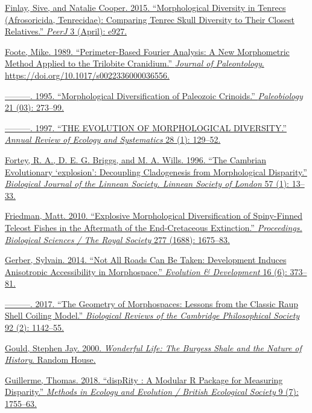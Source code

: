 \href{http://paperpile.com/b/sTGYvp/yyNa}{Finlay, Sive, and Natalie
Cooper. 2015. ``Morphological Diversity in Tenrecs (Afrosoricida,
Tenrecidae): Comparing Tenrec Skull Diversity to Their Closest
Relatives.'' \emph{PeerJ} 3 (April): e927.}

\href{http://paperpile.com/b/sTGYvp/2Neu}{Foote, Mike. 1989.
``Perimeter-Based Fourier Analysis: A New Morphometric Method Applied to
the Trilobite Cranidium.'' \emph{Journal of Paleontology}.
https://doi.org/}\href{http://dx.doi.org/10.1017/s0022336000036556}{10.1017/s0022336000036556}\href{http://paperpile.com/b/sTGYvp/2Neu}{.}

\href{http://paperpile.com/b/sTGYvp/fTJ3}{---------. 1995.
``Morphological Diversification of Paleozoic Crinoids.''
\emph{Paleobiology} 21 (03): 273--99.}

\href{http://paperpile.com/b/sTGYvp/yqPw}{---------. 1997. ``THE
EVOLUTION OF MORPHOLOGICAL DIVERSITY.'' \emph{Annual Review of Ecology
and Systematics} 28 (1): 129--52.}

\href{http://paperpile.com/b/sTGYvp/2tbJ}{Fortey, R. A., D. E. G.
Briggs, and M. A. Wills. 1996. ``The Cambrian Evolutionary `explosion':
Decoupling Cladogenesis from Morphological Disparity.'' \emph{Biological
Journal of the Linnean Society. Linnean Society of London} 57 (1):
13--33.}

\href{http://paperpile.com/b/sTGYvp/EETc}{Friedman, Matt. 2010.
``Explosive Morphological Diversification of Spiny-Finned Teleost Fishes
in the Aftermath of the End-Cretaceous Extinction.'' \emph{Proceedings.
Biological Sciences / The Royal Society} 277 (1688): 1675--83.}

\href{http://paperpile.com/b/sTGYvp/SJbC}{Gerber, Sylvain. 2014. ``Not
All Roads Can Be Taken: Development Induces Anisotropic Accessibility in
Morphospace.'' \emph{Evolution \& Development} 16 (6): 373--81.}

\href{http://paperpile.com/b/sTGYvp/QVvv}{---------. 2017. ``The
Geometry of Morphospaces: Lessons from the Classic Raup Shell Coiling
Model.'' \emph{Biological Reviews of the Cambridge Philosophical
Society} 92 (2): 1142--55.}

\href{http://paperpile.com/b/sTGYvp/Uns3}{Gould, Stephen Jay. 2000.
\emph{Wonderful Life: The Burgess Shale and the Nature of History}.
Random House.}

\href{http://paperpile.com/b/sTGYvp/xDqf}{Guillerme, Thomas. 2018.
``dispRity : A Modular R Package for Measuring Disparity.''
\emph{Methods in Ecology and Evolution / British Ecological Society} 9
(7): 1755--63.}

